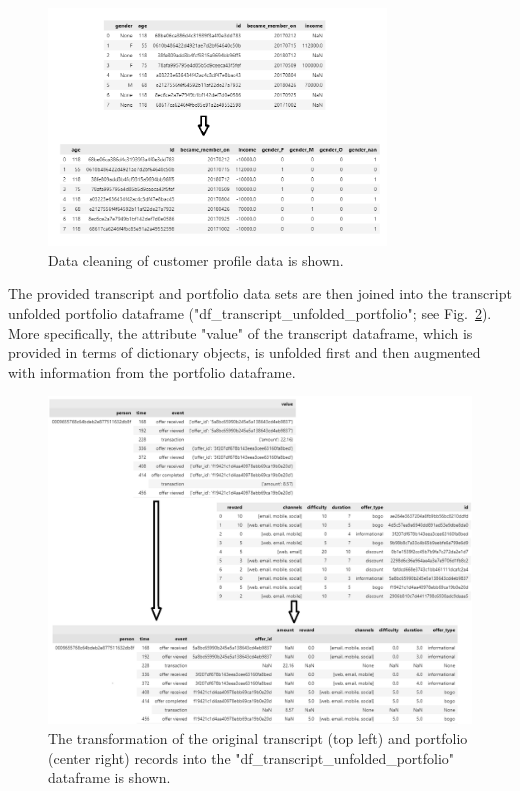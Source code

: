 \documentclass[11pt]{article} %
\begin{document}
\begin{figure}[H]
\centering
  \includegraphics[width=0.8\textwidth]{pics/profile_cleaning.png}
\caption{\label{implementation step1.1}Data cleaning of customer profile data is shown.}
\end{figure}

The provided transcript and portfolio data sets are then joined into the transcript unfolded portfolio dataframe ("df\_transcript\_unfolded\_portfolio"; see Fig.~\ref{implementation step1.2}).
More specifically, the attribute "value" of the transcript dataframe, which is provided in terms of dictionary objects, is unfolded first and then augmented with information from the portfolio dataframe.

\begin{figure}[H]
   \centering
  \includegraphics[width=1\textwidth]{pics/transcript_transformation.png}
\caption{\label{implementation step1.2}The transformation of the original transcript (top left) and portfolio (center right) records into the "df\_transcript\_unfolded\_portfolio" dataframe is shown.}
\end{figure}
\end{document}
